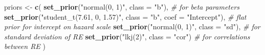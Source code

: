 \documentclass[
  man,floatsintext]{apa6}
\newenvironment{Shaded}{\begin{snugshade}}{\end{snugshade}}
\newcommand{\AttributeTok}[1]{\textcolor[rgb]{0.13,0.29,0.53}{#1}}
\newcommand{\CommentTok}[1]{\textcolor[rgb]{0.56,0.35,0.01}{\textit{#1}}}
\newcommand{\FunctionTok}[1]{\textcolor[rgb]{0.13,0.29,0.53}{\textbf{#1}}}
\newcommand{\NormalTok}[1]{#1}
\newcommand{\OtherTok}[1]{\textcolor[rgb]{0.56,0.35,0.01}{#1}}
\newcommand{\StringTok}[1]{\textcolor[rgb]{0.31,0.60,0.02}{#1}}
\begin{document}
\begin{Shaded}
\begin{Highlighting}[]
\NormalTok{priors }\OtherTok{\textless{}{-}} \FunctionTok{c}\NormalTok{(}
  \FunctionTok{set\_prior}\NormalTok{(}\StringTok{"normal(0, 1)"}\NormalTok{, }\AttributeTok{class =} \StringTok{"b"}\NormalTok{), }\CommentTok{\# for beta parameters }
  \FunctionTok{set\_prior}\NormalTok{(}\StringTok{"student\_t(7.61, 0, 1.57)"}\NormalTok{, }\AttributeTok{class =} \StringTok{"b"}\NormalTok{, }\AttributeTok{coef =} \StringTok{"Intercept"}\NormalTok{), }\CommentTok{\# flat prior for intercept on hazard scale}
  \FunctionTok{set\_prior}\NormalTok{(}\StringTok{"normal(0, 1)"}\NormalTok{, }\AttributeTok{class =} \StringTok{"sd"}\NormalTok{), }\CommentTok{\# for standard deviation of RE}
  \FunctionTok{set\_prior}\NormalTok{(}\StringTok{"lkj(2)"}\NormalTok{, }\AttributeTok{class =} \StringTok{"cor"}\NormalTok{) }\CommentTok{\# for correlations between RE}
\NormalTok{)}
\end{Highlighting}
\end{Shaded}
\end{document}
